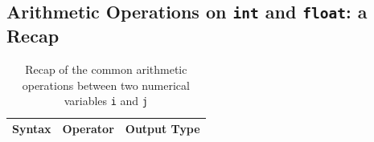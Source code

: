 \documentclass[t,handout,9pt]{beamer}
\begin{document}
\subsection{Arithmetic Operations on \texttt{int} and \texttt{float}: a Recap}
\begin{frame}%
\vfill
\begin{table}[]
\centering
\caption{Recap of the common arithmetic operations between two numerical variables \texttt{i} and \texttt{j}}
	\begin{tabular}{@{}ccc@{}}
	\toprule
	\textbf{Syntax} & \textbf{Operator}  & \textbf{Output Type}                                                                                                                                                                        \\ \midrule

\end{tabular}
\end{table}
\end{frame}
\end{document}
